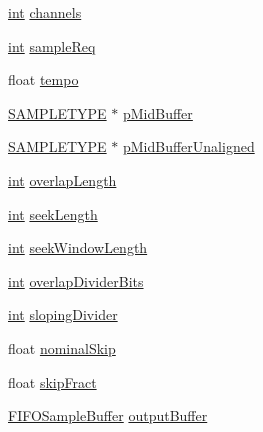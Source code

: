 \begin{DoxyCompactItemize}
\item 
\hyperlink{xmltok_8h_a5a0d4a5641ce434f1d23533f2b2e6653}{int} \hyperlink{classsoundtouch_1_1_t_d_stretch_a8a19ab5d68efd8f21fe88e6d2fc9e2c8}{channels}
\item 
\hyperlink{xmltok_8h_a5a0d4a5641ce434f1d23533f2b2e6653}{int} \hyperlink{classsoundtouch_1_1_t_d_stretch_a2d7623288d40efe1381fc86ca8dee9cf}{sample\+Req}
\item 
float \hyperlink{classsoundtouch_1_1_t_d_stretch_a97f816f5041ed44832049d51e6212cfa}{tempo}
\item 
\hyperlink{namespacesoundtouch_a97cfd29a7abb4d4b2a72f803d5b5850c}{S\+A\+M\+P\+L\+E\+T\+Y\+PE} $\ast$ \hyperlink{classsoundtouch_1_1_t_d_stretch_ae8ecce9c1a28ac0e281413ab2d1ffff8}{p\+Mid\+Buffer}
\item 
\hyperlink{namespacesoundtouch_a97cfd29a7abb4d4b2a72f803d5b5850c}{S\+A\+M\+P\+L\+E\+T\+Y\+PE} $\ast$ \hyperlink{classsoundtouch_1_1_t_d_stretch_a761455426dae783dd29b1a863ff92e32}{p\+Mid\+Buffer\+Unaligned}
\item 
\hyperlink{xmltok_8h_a5a0d4a5641ce434f1d23533f2b2e6653}{int} \hyperlink{classsoundtouch_1_1_t_d_stretch_a39b7d3bf7c87bf00571766e84f889fd8}{overlap\+Length}
\item 
\hyperlink{xmltok_8h_a5a0d4a5641ce434f1d23533f2b2e6653}{int} \hyperlink{classsoundtouch_1_1_t_d_stretch_ae31979437a926f5814eb8a30a9f62210}{seek\+Length}
\item 
\hyperlink{xmltok_8h_a5a0d4a5641ce434f1d23533f2b2e6653}{int} \hyperlink{classsoundtouch_1_1_t_d_stretch_a760e50b9c59ab6ec44946bc186acf541}{seek\+Window\+Length}
\item 
\hyperlink{xmltok_8h_a5a0d4a5641ce434f1d23533f2b2e6653}{int} \hyperlink{classsoundtouch_1_1_t_d_stretch_a8ef9271ed0e9ed8b7f9bcd0e42585ac4}{overlap\+Divider\+Bits}
\item 
\hyperlink{xmltok_8h_a5a0d4a5641ce434f1d23533f2b2e6653}{int} \hyperlink{classsoundtouch_1_1_t_d_stretch_aae7b05e586c9c992e2ade01264f8676b}{sloping\+Divider}
\item 
float \hyperlink{classsoundtouch_1_1_t_d_stretch_a53b938868679a0ce730946f53f843403}{nominal\+Skip}
\item 
float \hyperlink{classsoundtouch_1_1_t_d_stretch_ac1e7943634556e4fa61224bb0d14a726}{skip\+Fract}
\item 
\hyperlink{classsoundtouch_1_1_f_i_f_o_sample_buffer}{F\+I\+F\+O\+Sample\+Buffer} \hyperlink{classsoundtouch_1_1_t_d_stretch_a75c79d3ba073ae7ebd2a3a2ba9f6a5e5}{output\+Buffer}

\end{DoxyCompactItemize}
